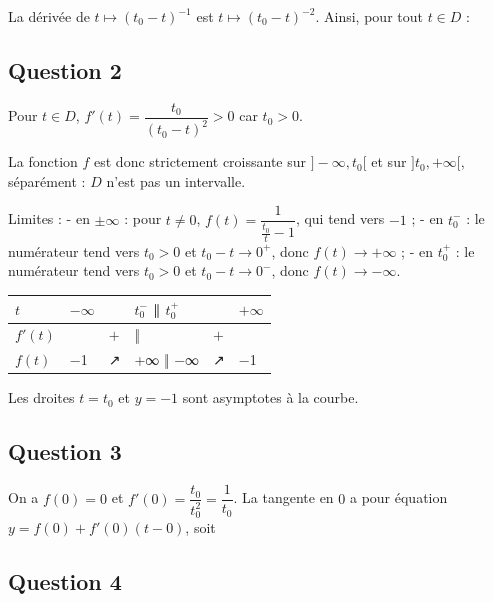 \documentclass[11pt,a4paper]{article}
\newcommand{\equationajustee}[1]{%
  \sbox{\boiteequation}{$\displaystyle #1$}%
  \ifdim\wd\boiteequation>\linewidth
    \[\resizebox{\linewidth}{!}{\usebox{\boiteequation}}\]%
  \else
    \[#1\]%
  \fi}
\begin{document}
La dérivée de \(t\mapsto(t_0-t)^{-1}\) est \(t\mapsto(t_0-t)^{-2}\). Ainsi, pour tout \(t\in D\) :

\equationajustee{\boxed{\begin{aligned}
f'(t)&=g'(t)\\
&=\frac{t_0}{(t_0-t)^2}
\end{aligned}}}

\hypertarget{question-2}{%
\subsection{Question 2}\label{question-2}}

Pour \(t\in D\), \(f'(t)=\dfrac{t_0}{(t_0-t)^2}>0\) car \(t_0>0\).

La fonction \(f\) est donc strictement croissante sur \(]-\infty,t_0[\) et sur \(]t_0,+\infty[\), séparément : \(D\) n'est pas un intervalle.

Limites :
- en \(\pm\infty\) : pour \(t\neq0\), \(f(t)=\dfrac{1}{\frac{t_0}{t}-1}\), qui tend vers \(-1\) ;
- en \(t_0^-\) : le numérateur tend vers \(t_0>0\) et \(t_0-t\to0^+\), donc \(f(t)\to+\infty\) ;
- en \(t_0^+\) : le numérateur tend vers \(t_0>0\) et \(t_0-t\to0^-\), donc \(f(t)\to-\infty\).

\begin{longtable}[]{@{}llllll@{}}
\toprule\noalign{}
\(t\) & \(-\infty\) & & \(t_0^-\) ‖ \(t_0^+\) & & \(+\infty\) \\
\midrule\noalign{}
\endhead
\bottomrule\noalign{}
\endlastfoot
\(f'(t)\) & & \(+\) & ‖ & \(+\) & \\
\(f(t)\) & −1 & ↗ & +∞ ‖ −∞ & ↗ & −1 \\
\end{longtable}

Les droites \(t=t_0\) et \(y=-1\) sont asymptotes à la courbe.

\hypertarget{question-3}{%
\subsection{Question 3}\label{question-3}}

On a \(f(0)=0\) et \(f'(0)=\dfrac{t_0}{t_0^2}=\dfrac1{t_0}\). La tangente en \(0\) a pour équation \(y=f(0)+f'(0)(t-0)\), soit

\equationajustee{\boxed{T:\ y=\frac{t}{t_0}}}

\hypertarget{question-4}{%
\subsection{Question 4}\label{question-4}}
\end{document}
